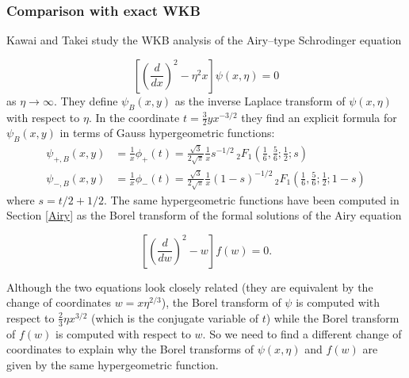 \documentclass{article}
\begin{document}
\subsubsection{Comparison with exact WKB}

Kawai and Takei study the WKB analysis of the Airy--type Schrodinger equation

\begin{equation}
\label{WKB_Airy} 
\left[\left(\frac{d}{dx}\right)^2 - \eta^2 x \right] \psi(x, \eta) = 0 
\end{equation}
as $\eta\to\infty$. They define $\psi_B(x, y)$ as the inverse Laplace transform of $\psi(x, \eta)$ with respect to $\eta$. In the coordinate $t=\frac{3}{2}yx^{-3/2}$ they find an explicit formula for $\psi_B(x,y)$ in terms of Gauss hypergeometric functions:
\begin{align*}
\psi_{+,B}(x,y)&=\frac{1}{x}\phi_+(t)=\frac{\sqrt{3}}{2\sqrt{\pi}}\frac{1}{x}s^{-1/2}\, {}_2F_1\left(\frac{1}{6},\frac{5}{6};\frac{1}{2};s\right)\\
\psi_{-,B}(x,y)&=\frac{1}{x}\phi_-(t)=\frac{\sqrt{3}}{2\sqrt{\pi}}\frac{1}{x}(1-s)^{-1/2}\, {}_2F_1\left(\frac{1}{6},\frac{5}{6};\frac{1}{2};1-s\right)
\end{align*}
where $s=t/2+1/2$. 
The same hypergeometric functions have been computed in Section \ref{Airy} as the Borel transform of the formal solutions of the Airy equation

\begin{equation}
\label{Airy}
\left[\left(\frac{d}{dw}\right)^2 -  w \right] f(w) = 0.
\end{equation}

Although the two equations look closely related (they are equivalent by the change of coordinates $w=x\eta^{2/3}$), the Borel transform of $\psi$ is computed with respect to $\frac{2}{3}\eta x^{3/2}$ (which is the conjugate variable of $t$) while the Borel transform of $f(w)$ is computed with respect to $w$. So we need to find a different change of coordinates to explain why the Borel transforms of $\psi(x,\eta)$ and $f(w)$ are given by the same hypergeometric function. 
\end{document}
